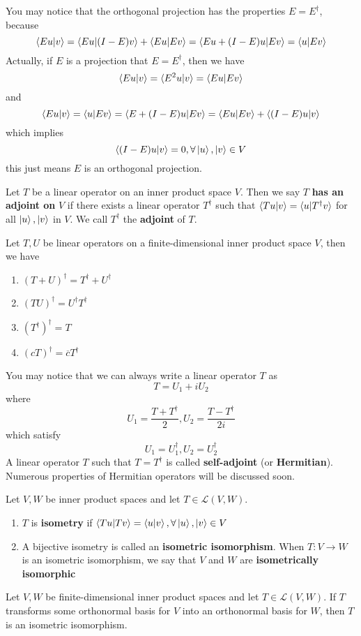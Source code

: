 \documentclass{article}
\begin{document}
You may notice that the orthogonal projection has the properties $E=E^\dagger$, because
\[\braket{Eu|v}=\braket{Eu|(I-E)v}+\braket{Eu|Ev}=\braket{Eu+(I-E)u|Ev}=\braket{u|Ev}\]
\indent Actually, if $E$ is a projection that $E=E^\dagger$, then we have
\[\braket{Eu|v}=\braket{E^2u|v}=\braket{Eu|Ev}\]
and
\[\braket{Eu|v}=\braket{u|Ev}=\braket{E+(I-E)u|Ev}=\braket{Eu|Ev}+\braket{(I-E)u|v}\]
which implies
\[\braket{(I-E)u|v}=0,\forall\ket{u},\ket{v}\in V\]
this just means $E$ is an orthogonal projection. 
\begin{dde}
	Let $T$ be a linear operator on an inner product space $V$. Then we say $T$ \textbf{has an adjoint on} $V$ if there exists a linear operator $T^\dagger$ such that $\braket{Tu|v}=\braket{u|T^\dagger v}$ for all $\ket{u},\ket{v}$ in $V$. We call $T^\dagger$ the \textbf{adjoint} of $T$. 
\end{dde}
\begin{thm}
	Let $T,U$ be linear operators on a finite-dimensional inner product space $V$, then we have
	\begin{enumerate}
		\item $(T+U)^\dagger=T^\dagger+U^\dagger$
		\item $(TU)^\dagger=U^\dagger T^\dagger$
		\item $(T^\dagger)^\dagger=T$
		\item $(cT)^\dagger=\overline{c}T^\dagger$
	\end{enumerate}
\end{thm}
You may notice that we can always write a linear operator $T$ as
\[T=U_1+iU_2\]
where
\[U_1=\frac{T+T^\dagger}{2},U_2=\frac{T-T^\dagger}{2i}\]
which satisfy
\[U_1=U_1^\dagger,U_2=U_2^\dagger\]
\indent A linear operator $T$ such that $T=T^\dagger$ is called \textbf{self-adjoint} (or \textbf{Hermitian}). Numerous properties of Hermitian operators will be discussed soon.
\begin{dde}
	Let $V,W$ be inner product spaces and let $T\in\mathcal{L}(V,W)$.
	\begin{enumerate}
		\item $T$ is \textbf{isometry} if $\braket{Tu|Tv}=\braket{u|v},\forall\ket{u},\ket{v}\in V$
		\item A bijective isometry is called an \textbf{isometric isomorphism}. When $T:V\rightarrow W$ is an isometric isomorphism, we say that $V$ and $W$ are \textbf{isometrically isomorphic}
	\end{enumerate}
\end{dde}
\begin{thm}
	Let $V,W$ be finite-dimensional inner product spaces and let $T\in\mathcal{L}(V,W)$. If $T$ transforms some orthonormal basis for $V$ into an orthonormal basis for $W$, then $T$ is an isometric isomorphism.
\end{thm}
\end{document}
